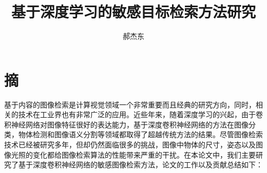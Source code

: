 

\confidential{} %
\title[基于深度学习的敏感目标检索方法研究]{基于深度学习的敏感目标检索方法研究}
\author{郝杰东} %
\advisorsec{} %



\maketitle
\makeenglishtitle

\makedeclaration

\chapter*{摘}
\setcounter{page}{1}%
基于内容的图像检索是计算视觉领域一个非常重要而且经典的研究方向，同时，相关的技术在工业界也有非常广泛的应用。近些年来，随着深度学习的兴起，由于卷积神经网络对图像特征很好的表达能力，基于深度卷积神经网络的方法在图像分类，物体检测和图像语义分割等领域都取得了超越传统方法的结果。尽管图像检索技术已经被研究多年，但却仍然面临很多的挑战，图像中物体的尺寸，姿态以及图像光照的变化都给图像检索算法的性能带来严重的干扰。在本论文中，我们主要研究了基于深度卷积神经网络的敏感图像检索方法，论文的工作以及贡献总结如下：

